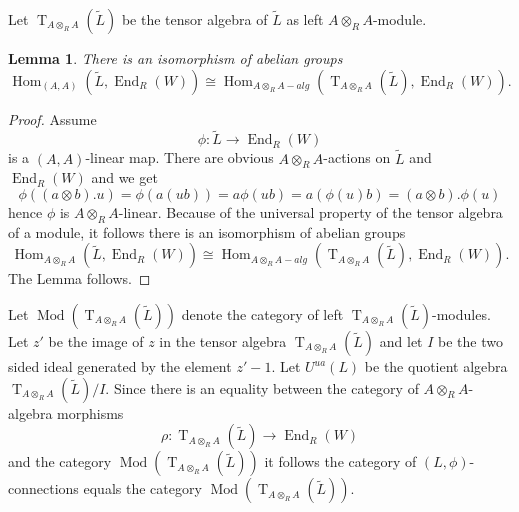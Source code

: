 \documentclass{amsart}
\theoremstyle{plain}
\newtheorem{lemma}[theorem]{Lemma}
\theoremstyle{definition}
\theoremstyle{remark}
\numberwithin{equation}{theorem}
\begin{document}
Let ${\operatorname{T}}_{{A}\otimes_{R} {A}}({\tilde{L} })$ be the tensor algebra of ${\tilde{L} }$ as left ${A}\otimes_{R} {A}$-module.

\begin{lemma} There is an isomorphism of abelian groups
\[{\operatorname{Hom} }_{({A},{A})}({\tilde{L} }, {\operatorname{End} }_{R}(W)) \cong {\operatorname{Hom} }_{{A}\otimes_{R} {A}-alg}({\operatorname{T}}_{{A}\otimes_{R} {A}}({\tilde{L} }), {\operatorname{End} }_{R}(W)) .\]
\end{lemma}
\begin{proof}  Assume 
\[ \phi:{\tilde{L} }\rightarrow {\operatorname{End} }_{R}(W) \]
is a $({A},{A})$-linear map. There are obvious ${A}\otimes_{R} {A}$-actions on ${\tilde{L} }$ and ${\operatorname{End} }_{R}(W)$ and we get
\[ \phi((a\otimes b).u)=\phi(a(ub))=a\phi(ub)=a(\phi(u)b)=(a\otimes b).\phi(u) \]
hence $\phi$ is ${A}\otimes_{R} {A}$-linear. 
Because of the universal property of the tensor algebra of a module, it follows there is an isomorphism 
of abelian groups
\[ {\operatorname{Hom} }_{{A}\otimes_{R} {A}}({\tilde{L} }, {\operatorname{End} }_{R}(W)) \cong {\operatorname{Hom} }_{{A}\otimes_{R} {A}-alg}({\operatorname{T}}_{{A}\otimes_{R} {A}}({\tilde{L} }), {\operatorname{End} }_{R}(W)) .\]
The Lemma follows.
\end{proof}

Let ${\operatorname{Mod}}({\operatorname{T}}_{{A}\otimes_{R} {A}}({\tilde{L} }))$ denote the category of left ${\operatorname{T}}_{{A}\otimes_{R} {A}}({\tilde{L} })$-modules.
Let $z' $ be the image of $z$ in the tensor algebra ${\operatorname{T}}_{{A}\otimes_{R} {A}}({\tilde{L} })$ and let $I$ be the two sided ideal
generated by the element $z'-1$. Let ${U^{ua}}(L)$ be the quotient algebra ${\operatorname{T}}_{{A}\otimes_{R} {A}}({\tilde{L} })/I$. Since there is an
equality between the category of ${A}\otimes_{R} {A}$-algebra morphisms
\[ \rho: {\operatorname{T}}_{{A}\otimes_{R} {A}}({\tilde{L} }) \rightarrow {\operatorname{End} }_{R}(W) \]
and the category ${\operatorname{Mod}}({\operatorname{T}}_{{A}\otimes_{R} {A}}({\tilde{L} }))$ it follows the category of $(L,\phi)$-connections
equals the category ${\operatorname{Mod}}({\operatorname{T}}_{{A}\otimes_{R} {A}}({\tilde{L} }))$. 
\end{document}

